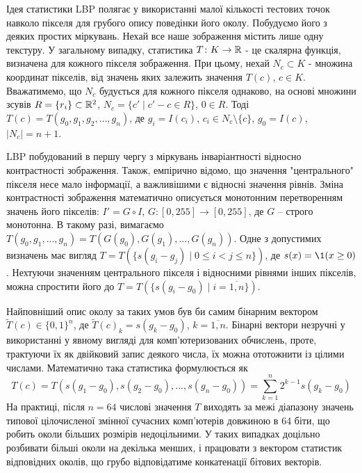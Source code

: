 Ідея статистики LBP \cite{ojala2002} полягає у використанні малої кількості тестових точок навколо пікселя для грубого опису поведінки його околу.
Побудуємо його з деяких простих міркувань.
Нехай все наше зображення містить лише одну текстуру.
У загальному випадку, статистика $T \colon K \to \mathbb R$ - це скалярна функція, визначена для кожного пікселя зображення. 
При цьому, нехай $N_c \subset K$ - множина координат пікселів, від значень яких залежить значення $T(c)$, $c \in K$. 
Вважатимемо, що $N_c$ будується для кожного пікселя однаково, на основі множини зсувів $R = \{r_i\} \subset \mathbb R^2$, $N_c = \{c' \mid c' - c \in R\}$, $0 \in R$.
Тоді $T(c) = T(g_0, g_1, g_2, \dots, g_n)$, де $g_i = I(c_i)$, $c_i \in N_c \setminus \{c\}$, $g_0 = I(c)$, $|N_c| = n+1$.

LBP побудований в першу чергу з міркувань інваріантності відносно контрастності зображення.
Також, емпірично відомо, що значення "центрального"{} пікселя несе мало інформації, а важливішими є відносні значення рівнів.  
Зміна контрастності зображення математично описується монотонним перетворенням значень його пікселів: $I' = G \circ I$, $G \colon [0,255] \to [0,255]$, де $G$ -- строго монотонна.
В такому разі, вимагаємо $T(g_0, g_1, ..., g_n) = T(G(g_0), G(g_1), ..., G(g_n))$.
Одне з допустимих визначень має вигляд $T = T(\{s(g_i - g_j) \mid 0\le i<j \le n\})$, де $s(x) = \1(x \ge 0)$.
Нехтуючи значенням центрального пікселя і відносними рівнями інших пікселів, можна спростити його до $T = T(\{s(g_i - g_0) \mid i=\overline{1,n}\})$.

Найповніший опис околу за таких умов був би самим бінарним вектором $\tilde T(c) \in \{0,1\}^n$,
де $\tilde T(c)_k = s(g_k - g_0)$, $k=\overline{1,n}$.
Бінарні вектори незручні у використанні у явному вигляді для комп'ютеризованих обчислень, проте, трактуючи їх як двійковий запис деякого числа, 
їх можна ототожнити із цілими числами. Математично така статистика формулюється як 
\begin{equation}\label{e:ojala-T}
    T(c) = T(s(g_1 - g_0), s(g_2 - g_0), ..., s(g_n - g_0)) = \sum_{k=1}^n 2^{k-1}s(g_k-g_0)
\end{equation}
На практиці, після $n=64$ числові значення $T$ виходять за межі діапазону значень типової цілочисленої змінної сучасних комп'ютерів довжиною в 64 біти, 
що робить околи більших розмірів недоцільними. У таких випадках доцільно розбивати більші околи на декілька менших, і працювати з вектором статистик відповідних околів,
що грубо відповідатиме конкатенації бітових векторів. 

